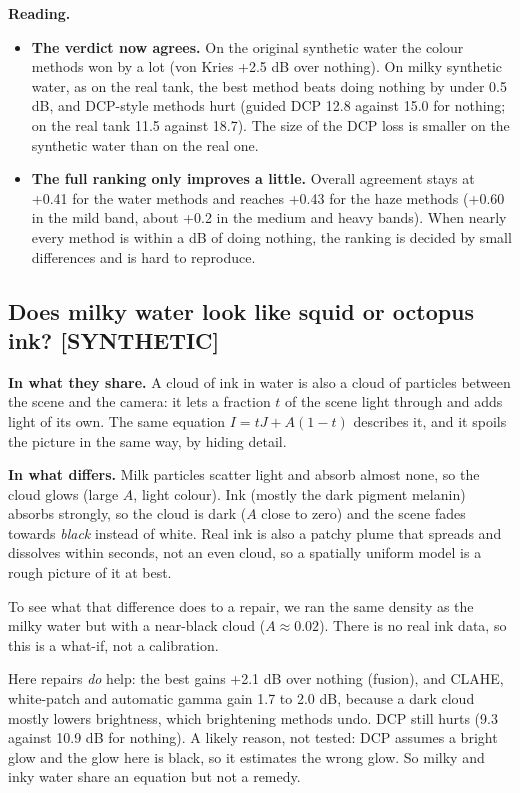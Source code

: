 \documentclass[10pt,a4paper]{article}
\newcommand{\tablein}[1]{}
\newcommand{\SYN}{\textcolor{orange!85!black}{\textbf{[SYNTHETIC]}}}
\begin{document}
\textbf{Reading.}
\begin{itemize}
\item \textbf{The verdict now agrees.} On the original synthetic water the colour methods won by a lot (von Kries +2.5 dB over nothing). On milky synthetic water, as on the real tank, the best method beats doing nothing by under 0.5 dB, and DCP-style methods hurt (guided DCP 12.8 against 15.0 for nothing; on the real tank 11.5 against 18.7). The size of the DCP loss is smaller on the synthetic water than on the real one.
\item \textbf{The full ranking only improves a little.} Overall agreement stays at +0.41 for the water methods and reaches +0.43 for the haze methods (+0.60 in the mild band, about +0.2 in the medium and heavy bands). When nearly every method is within a dB of doing nothing, the ranking is decided by small differences and is hard to reproduce.
\end{itemize}

\subsection{Does milky water look like squid or octopus ink? \SYN}
\textbf{In what they share.} A cloud of ink in water is also a cloud of particles between the scene and the camera: it lets a fraction $t$ of the scene light through and adds light of its own. The same equation $I=tJ+A(1-t)$ describes it, and it spoils the picture in the same way, by hiding detail.

\textbf{In what differs.} Milk particles scatter light and absorb almost none, so the cloud glows (large $A$, light colour). Ink (mostly the dark pigment melanin) absorbs strongly, so the cloud is dark ($A$ close to zero) and the scene fades towards \emph{black} instead of white. Real ink is also a patchy plume that spreads and dissolves within seconds, not an even cloud, so a spatially uniform model is a rough picture of it at best.

To see what that difference does to a repair, we ran the same density as the milky water but with a near-black cloud ($A\approx0.02$). There is no real ink data, so this is a what-if, not a calibration.
\begin{table}[H]\centering\scriptsize\tablein{milky_ink}\caption{\SYN\ Ink what-if (black cloud, same densities as the milky water, 12 scenes). Compare with the milky table above.}\end{table}
Here repairs \emph{do} help: the best gains +2.1 dB over nothing (fusion), and CLAHE, white-patch and automatic gamma gain 1.7 to 2.0 dB, because a dark cloud mostly lowers brightness, which brightening methods undo. DCP still hurts (9.3 against 10.9 dB for nothing). A likely reason, not tested: DCP assumes a bright glow and the glow here is black, so it estimates the wrong glow. So milky and inky water share an equation but not a remedy.
\end{document}
